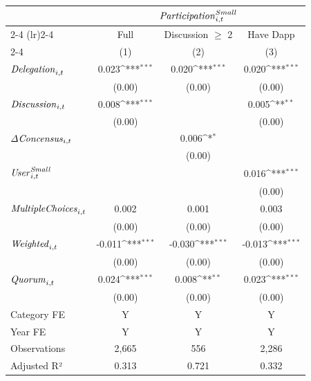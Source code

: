 {
\def\sym#1{\ifmmode^{#1}\else\(^{#1}\)\fi}
\begin{tabular}{l*{3}{c}}
\toprule
                    &\multicolumn{3}{c}{${\it Participation}^{Small}_{i,t}$}          \\\cmidrule(lr){2-4}
\cmidrule(lr){2-4} & \multicolumn{1}{c}{Full} & \multicolumn{1}{c}{Discussion $\geq$ 2} & \multicolumn{1}{c}{Have Dapp} \\ \cmidrule(lr){2-4} & \multicolumn{1}{c}{(1)} & \multicolumn{1}{c}{(2)} & \multicolumn{1}{c}{(3)} \\ \midrule
${\it Delegation}_{i,t}$&       0.023\sym{***}&       0.020\sym{***}&       0.020\sym{***}\\
                    &      (0.00)         &      (0.00)         &      (0.00)         \\
${\it Discussion}_{i,t}$&       0.008\sym{***}&                     &       0.005\sym{**} \\
                    &      (0.00)         &                     &      (0.00)         \\
${\it \Delta Concensus}_{i,t}$&                     &       0.006\sym{*}  &                     \\
                    &                     &      (0.00)         &                     \\
${\it User}_{i,t}^{\it Small}$&                     &                     &       0.016\sym{***}\\
                    &                     &                     &      (0.00)         \\
${\it Multiple Choices}_{i,t}$&       0.002         &       0.001         &       0.003         \\
                    &      (0.00)         &      (0.00)         &      (0.00)         \\
${\it Weighted}_{i,t}$&      -0.011\sym{***}&      -0.030\sym{***}&      -0.013\sym{***}\\
                    &      (0.00)         &      (0.00)         &      (0.00)         \\
${\it Quorum}_{i,t}$&       0.024\sym{***}&       0.008\sym{**} &       0.023\sym{***}\\
                    &      (0.00)         &      (0.00)         &      (0.00)         \\
\midrule
Category FE         &           Y         &           Y         &           Y         \\
Year FE             &           Y         &           Y         &           Y         \\
Observations        &       2,665         &         556         &       2,286         \\
Adjusted R²         &       0.313         &       0.721         &       0.332         \\
\bottomrule
\end{tabular}
}
